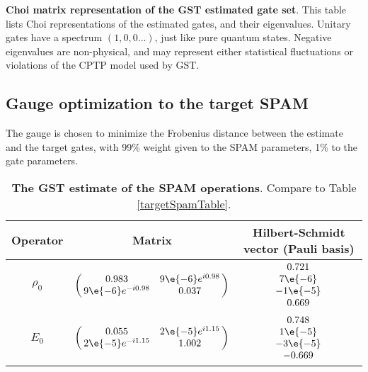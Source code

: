 {\begin{table}[h]
\begin{center}
\caption{\textbf{Choi matrix representation of the GST estimated gate set}.  This table lists Choi representations of the estimated gates, and their eigenvalues.  Unitary gates have a spectrum $(1,0,0\ldots)$, just like pure quantum states.  Negative eigenvalues are non-physical, and may represent either statistical fluctuations or violations of the CPTP model used by GST.\label{bestTargetGatesetChoiTable}}
\end{center}
\end{table}


\clearpage

\subsection{Gauge optimization to the target SPAM}
The gauge is chosen to minimize the Frobenius distance between the estimate and the target gates, with 99\% weight given to the SPAM parameters, 1\% to the gate parameters.

\begin{table}[h]
\begin{center}
\begin{tabular}[l]{|c|c|c|}
\hline
Operator & Matrix & Hilbert-Schmidt vector (Pauli basis) \\ \hline
$\rho_{0}$ & $ \left(\!\!\begin{array}{cc}
0.983 & 9\e{-6}e^{i0.98} \\ 
9\e{-6}e^{-i0.98} & 0.037
 \end{array}\!\!\right) $
 & $ \begin{array}{c}
0.721 \\ 
7\e{-6} \\ 
-1\e{-5} \\ 
0.669
 \end{array} $
 \\ \hline
$E_{0}$ & $ \left(\!\!\begin{array}{cc}
0.055 & 2\e{-5}e^{i1.15} \\ 
2\e{-5}e^{-i1.15} & 1.002
 \end{array}\!\!\right) $
 & $ \begin{array}{c}
0.748 \\ 
1\e{-5} \\ 
-3\e{-5} \\ 
-0.669
 \end{array} $
 \\ \hline
\end{tabular}

\caption{\textbf{The GST estimate of the SPAM operations}.  Compare to Table \ref{targetSpamTable}.\label{bestTargetSpamGatesetSpamTable}}
\end{center}
\end{table}

}
